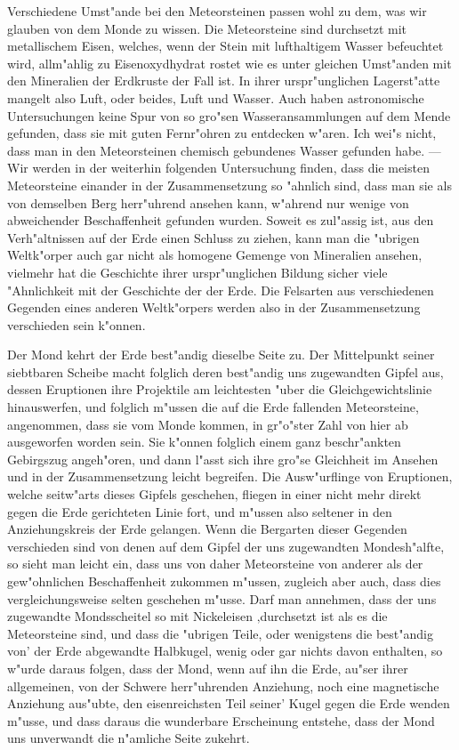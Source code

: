 \documentclass[a4paper, 11pt, oneside]{article}
\begin{document}
Verschiedene Umst"ande bei den Meteorsteinen passen wohl zu dem, was wir glauben von dem Monde zu wissen. Die Meteorsteine sind durchsetzt mit metallischem Eisen, welches, wenn der Stein mit lufthaltigem Wasser befeuchtet wird, allm"ahlig zu Eisenoxydhydrat rostet wie es unter gleichen Umst"anden mit den Mineralien der Erdkruste der Fall ist. In ihrer urspr"unglichen Lagerst"atte mangelt also Luft, oder beides, Luft und Wasser. Auch haben astronomische Untersuchungen keine Spur von so gro"sen Wasseransammlungen auf dem Mende gefunden, dass sie mit guten Fernr"ohren zu entdecken w"aren. Ich wei"s nicht, dass man in den Meteorsteinen chemisch gebundenes Wasser gefunden habe. --- Wir werden in der weiterhin folgenden Untersuchung finden, dass die meisten Meteorsteine einander in der Zusammensetzung so "ahnlich sind, dass man sie als von demselben Berg herr"uhrend ansehen kann, w"ahrend nur wenige von abweichender Beschaffenheit gefunden wurden. Soweit es zul"assig ist, aus den Verh"altnissen auf der Erde einen Schluss zu ziehen, kann man die "ubrigen Weltk"orper auch gar nicht als homogene Gemenge von Mineralien ansehen, vielmehr hat die Geschichte ihrer urspr"unglichen Bildung sicher viele "Ahnlichkeit mit der Geschichte der der Erde. Die Felsarten aus verschiedenen Gegenden eines anderen Weltk"orpers werden also in der Zusammensetzung verschieden sein k"onnen.

Der Mond kehrt der Erde best"andig dieselbe Seite zu. Der Mittelpunkt seiner siebtbaren Scheibe macht folglich deren best"andig uns zugewandten Gipfel aus, dessen Eruptionen ihre Projektile am leichtesten "uber die Gleichgewichtslinie hinauswerfen, und folglich m"ussen die auf die Erde fallenden Meteorsteine, angenommen, dass sie vom Monde kommen, in gr"o"ster Zahl von hier ab ausgeworfen worden sein. Sie k"onnen folglich einem ganz beschr"ankten Gebirgszug angeh"oren, und dann l"asst sich ihre gro"se Gleichheit im Ansehen und in der Zusammensetzung leicht begreifen. Die Ausw"urflinge von Eruptionen, welche seitw"arts dieses Gipfels geschehen, fliegen in einer nicht mehr direkt gegen die Erde gerichteten Linie fort, und m"ussen also seltener in den Anziehungskreis der Erde gelangen. Wenn die Bergarten dieser Gegenden verschieden sind von denen auf dem Gipfel der uns zugewandten Mondesh"alfte, so sieht man leicht ein, dass uns von daher Meteorsteine von anderer als der gew"ohnlichen Beschaffenheit zukommen m"ussen, zugleich aber auch, dass dies vergleichungsweise selten geschehen m"usse. Darf man annehmen, dass der uns zugewandte Mondsscheitel so mit Nickeleisen ‚durchsetzt ist als es die Meteorsteine sind, und dass die "ubrigen Teile, oder wenigstens die best"andig von’ der Erde abgewandte Halbkugel, wenig oder gar nichts davon enthalten, so w"urde daraus folgen, dass der Mond, wenn auf ihn die Erde, au"ser ihrer allgemeinen, von der Schwere herr"uhrenden Anziehung, noch eine magnetische Anziehung aus"ubte, den eisenreichsten Teil seiner’ Kugel gegen die Erde wenden m"usse, und dass daraus die wunderbare Erscheinung entstehe, dass der Mond uns unverwandt die n"amliche Seite zukehrt.
\end{document}
